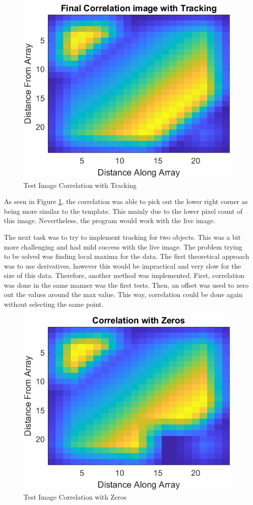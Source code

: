 \begin{figure}[H]
    \centering
    \includegraphics[width=0.5\linewidth]{figures/TrackingImage4.png}
    \caption{Test Image Correlation with Tracking}
    \label{fig:TrackingImage4}
\end{figure}

As seen in Figure \ref{fig:TrackingImage4}, the correlation was able to pick out the lower right corner as being more similar to the template. This mainly due to the lower pixel count of this image. Nevertheless, the program would work with the live image.

The next task was to try to implement tracking for two objects. This was a bit more challenging and had mild success with the live image. The problem trying to be solved was finding local maxima for the data. The first theoretical approach was to use derivatives, however this would be impractical and very slow for the size of this data. Therefore, another method was implemented. First, correlation was done in the same manner was the first tests. Then, an offset was used to zero out the values around the max value. This way, correlation could be done again without selecting the same point. 

\begin{figure}[H]
    \centering
    \includegraphics[width=0.5\linewidth]{figures/TrackingImage5.png}
    \caption{Test Image Correlation with Zeros}
    \label{fig:TrackingImage5}
\end{figure}

